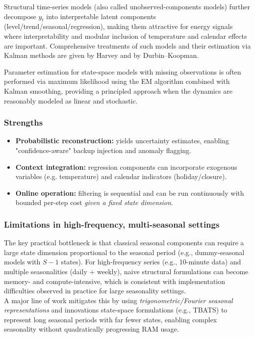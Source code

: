 Structural time-series models (also called unobserved-components models) further decompose $y_t$ into interpretable latent components (level/trend/seasonal/regression), making them attractive for energy signals where interpretability and modular inclusion of temperature and calendar effects are important. Comprehensive treatments of such models and their estimation via Kalman methods are given by Harvey and by Durbin--Koopman.%

Parameter estimation for state-space models with missing observations is often performed via maximum likelihood using the EM algorithm combined with Kalman smoothing, providing a principled approach when the dynamics are reasonably modeled as linear and stochastic.%

\subsubsection{Strengths}
\begin{itemize}
\item \textbf{Probabilistic reconstruction:} yields uncertainty estimates, enabling "confidence-aware" backup injection and anomaly flagging.
\item \textbf{Context integration:} regression components can incorporate exogenous variables (e.g. temperature) and calendar indicators (holiday/closure).
\item \textbf{Online operation:} filtering is sequential and can be run continuously with bounded per-step cost \emph{given a fixed state dimension}.
\end{itemize}

\subsubsection{Limitations in high-frequency, multi-seasonal settings}
The key practical bottleneck is that classical seasonal components can require a large state dimension proportional to the seasonal period (e.g., dummy-seasonal models with $S{-}1$ states). For high-frequency series (e.g., 10-minute data) and multiple seasonalities (daily + weekly), naive structural formulations can become memory- and compute-intensive, which is consistent with implementation difficulties observed in practice for large seasonality settings.\\

A major line of work mitigates this by using \emph{trigonometric/Fourier seasonal representations} and innovations state-space formulations (e.g., TBATS) to represent long seasonal periods with far fewer states, enabling complex seasonality without quadratically progressing RAM usage.\\%

